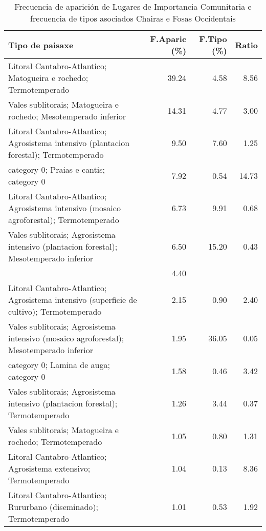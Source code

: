 \begin{table}[p]
\centering
\caption{Frecuencia de aparición de Lugares de Importancia Comunitaria e frecuencia de tipos asociados Chairas e Fosas Occidentais} 
\label{vnatura11}
\begin{tabular}{lrrr}
  \hline
Tipo de paisaxe & F.Aparic (\%) & F.Tipo (\%) & Ratio \\ 
  \hline
Litoral Cantabro-Atlantico; Matogueira e rochedo; Termotemperado & 39.24 & 4.58 & 8.56 \\ 
  Vales sublitorais; Matogueira e rochedo; Mesotemperado inferior & 14.31 & 4.77 & 3.00 \\ 
  Litoral Cantabro-Atlantico; Agrosistema intensivo (plantacion forestal); Termotemperado & 9.50 & 7.60 & 1.25 \\ 
  category 0; Praias e cantis; category 0 & 7.92 & 0.54 & 14.73 \\ 
  Litoral Cantabro-Atlantico; Agrosistema intensivo (mosaico agroforestal); Termotemperado & 6.73 & 9.91 & 0.68 \\ 
  Vales sublitorais; Agrosistema intensivo (plantacion forestal); Mesotemperado inferior & 6.50 & 15.20 & 0.43 \\ 
   & 4.40 &  &  \\ 
  Litoral Cantabro-Atlantico; Agrosistema intensivo (superficie de cultivo); Termotemperado & 2.15 & 0.90 & 2.40 \\ 
  Vales sublitorais; Agrosistema intensivo (mosaico agroforestal); Mesotemperado inferior & 1.95 & 36.05 & 0.05 \\ 
  category 0; Lamina de auga; category 0 & 1.58 & 0.46 & 3.42 \\ 
  Vales sublitorais; Agrosistema intensivo (plantacion forestal); Termotemperado & 1.26 & 3.44 & 0.37 \\ 
  Vales sublitorais; Matogueira e rochedo; Termotemperado & 1.05 & 0.80 & 1.31 \\ 
  Litoral Cantabro-Atlantico; Agrosistema extensivo; Termotemperado & 1.04 & 0.13 & 8.36 \\ 
  Litoral Cantabro-Atlantico; Rururbano (diseminado); Termotemperado & 1.01 & 0.53 & 1.92 \\ 
   \hline
\end{tabular}
\end{table}
